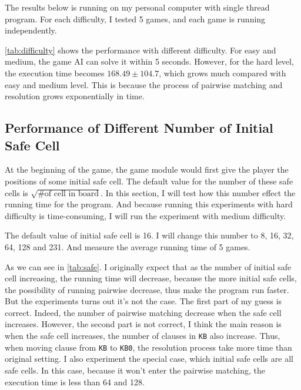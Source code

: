 \documentclass[twocolumn]{extarticle}
\begin{document}
The results below is running on my personal computer with single thread program. For each difficulty, I tested 5 games, and each game is running independently.

\autoref{tab:difficulty} shows the performance with different difficulty. For easy and medium, the game AI can solve it within 5 seconds. However, for the hard level, the execution time becomes $168.49\pm104.7$, which grows much compared with easy and medium level. This is because the process of pairwise matching and resolution grows exponentially in time.

\begin{table}[H]
\centering
\caption{The execution time, win and stuck status with different difficulty. I also record the average remaining unmarked cell when stuck. For the hard level, this number is 20.33, which is not much.}
\label{tab:difficulty}
\end{table}

\subsection{Performance of Different Number of Initial Safe Cell}

At the beginning of the game, the game module would first give the player the positions of some initial safe cell. The default value for the number of these safe cells is $\sqrt{\text{\# of cell in board}}$. In this section, I will test how this number effect the running time for the program. And because running this experiments with hard difficulty is time-consuming, I will run the experiment with medium difficulty. 

The default value of initial safe cell is 16. I will change this number to 8, 16, 32, 64, 128 and 231. And measure the average running time of 5 games. 

As we can see in \autoref{tab:safe}. I originally expect that as the number of initial safe cell increasing, the running time will decrease, because the more initial safe cells, the possibility of running pairwise decrease, thus make the program run faster. But the experiments turns out it's not the case. The first part of my guess is correct. Indeed, the number of pairwise matching decrease when the safe cell increases. However, the second part is not correct, I think the main reason is when the safe cell increases, the number of clauses in \texttt{KB} also increase. Thus, when moving clause from \texttt{KB} to \texttt{KB0}, the resolution process take more time than original setting. I also experiment the special case, which initial safe cells are all safe cells. In this case, because it won't enter the pairwise matching, the execution time is less than 64 and 128.
\end{document}
